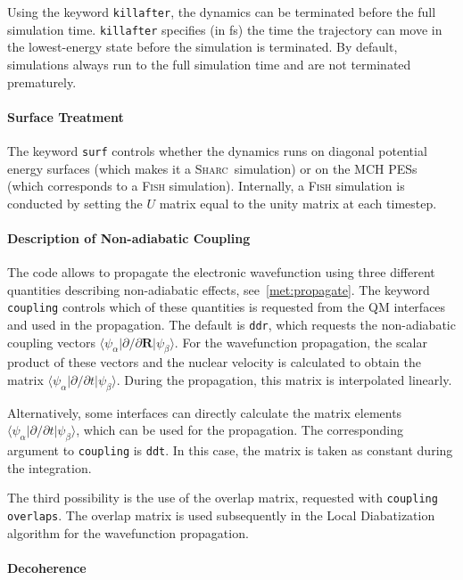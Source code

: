 \documentclass[a4paper,11pt,DIV=15,openany,twoside=false]{scrbook}
\newcommand{\sharc}{\textsc{Sharc}}
\newcommand{\ttt}[1]{\texttt{#1}}
\renewcommand{\vec}[1]{\ensuremath{\mathbf{#1}}}
\begin{document}
Using the keyword \ttt{killafter}, the dynamics can be terminated before the full simulation time. \ttt{killafter} specifies (in fs) the time the trajectory can move in the lowest-energy state before the simulation is terminated. By default, simulations always run to the full simulation time and are not terminated prematurely.

\paragraph{Surface Treatment}

The keyword \ttt{surf} controls whether the dynamics runs on diagonal potential energy surfaces (which makes it a \sharc\ simulation) or on the MCH PESs (which corresponds to a \textsc{Fish} simulation). Internally, a \textsc{Fish} simulation is conducted by setting the $U$ matrix equal to the unity matrix at each timestep. 

\paragraph{Description of Non-adiabatic Coupling}

The code allows to propagate the electronic wavefunction using three different quantities describing non-adiabatic effects, see~\ref{met:propagate}. The keyword \ttt{coupling} controls which of these quantities is requested from the QM interfaces and used in the propagation. The default is \ttt{ddr}, which requests the non-adiabatic coupling vectors $\langle\psi_\alpha|\partial/\partial \vec{R}|\psi_\beta\rangle$. For the wavefunction propagation, the scalar product of these vectors and the nuclear velocity is calculated to obtain the matrix $\langle\psi_\alpha|\partial/\partial t|\psi_\beta\rangle$. During the propagation, this matrix is interpolated linearly.

Alternatively, some interfaces can directly calculate the matrix elements $\langle\psi_\alpha|\partial/\partial t|\psi_\beta\rangle$, which can be used for the propagation. The corresponding argument to \ttt{coupling} is \ttt{ddt}. In this case, the matrix is taken as constant during the integration.

The third possibility is the use of the overlap matrix, requested with \ttt{coupling overlaps}. The overlap matrix is used subsequently in the Local Diabatization algorithm for the wavefunction propagation.

\paragraph{Decoherence}
\end{document}
